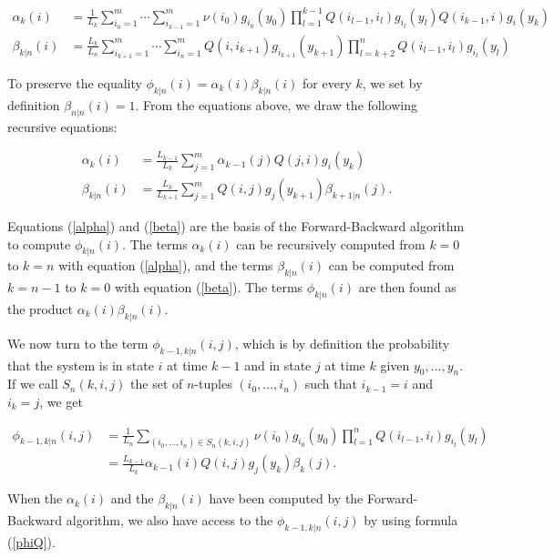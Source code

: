 \documentclass[12pt]{article}
\begin{document}
\begin{appendices}
    \begin{align*}
      \alpha_k(i) &= \frac{1}{L_k}
      \sum_{i_0=1}^m \cdots \sum_{i_{k-1}=1}^m
      \nu(i_0)g_{i_0}(y_0) \prod_{l=1}^{k-1} Q(i_{l-1},i_l) g_{i_l}(y_l)
      Q(i_{k-1}, i)g_i(y_k) \\
      \beta_{k|n}(i) &= \frac{L_k}{L_n}
      \sum_{i_{k+1}=1}^m \cdots \sum_{i_n=1}^m
      Q(i, i_{k+1})g_{i_{k+1}}(y_{k+1})
      \prod_{l=k+2}^n Q(i_{l-1}, i_l)g_{i_l}(y_l)
    \end{align*}

    To preserve the equality $\phi_{k|n}(i) = \alpha_k(i)\beta_{k|n}(i)$
    for every $k$, we set by definition $\beta_{n|n}(i) = 1$.
    From the equations above, we draw the following recursive
    equations:

    \begin{align} \alpha_k(i) &= \frac{L_{k-1}}{L_k}
      \sum_{j=1}^m \alpha_{k-1}(j) Q(j,i) g_i(y_k) \label{alpha} \\
      \beta_{k|n}(i) &= \frac{L_k}{L_{k+1}}
      \sum_{j=1}^m Q(i,j) g_j(y_{k+1})
      \beta_{k+1|n}(j). \label{beta}
    \end{align}

    Equations (\ref{alpha}) and (\ref{beta}) are the basis of the
    Forward-Backward algorithm to compute $\phi_{k|n}(i)$. The terms
    $\alpha_k(i)$ can be recursively computed from $k=0$ to $k=n$
    with equation (\ref{alpha}), and the terms $\beta_{k|n}(i)$
    can be computed from $k=n-1$ to $k=0$ with equation (\ref{beta}).
    The terms $\phi_{k|n}(i)$ are then found as the product
    $\alpha_k(i)\beta_{k|n}(i)$.

    We now turn to the term $\phi_{k-1,k|n}(i,j)$, which is by
    definition the probability that the system is in state $i$ at
    time $k-1$ and in state $j$ at time $k$ given $y_0, \ldots, y_n$.
    If we call $S_n(k,i,j)$
    the set of $n$-tuples $(i_0, \ldots, i_n)$ such that
    $i_{k-1} = i$ and $i_k = j$, we get

    \begin{align}
      \phi_{k-1,k|n}(i,j) &= \frac{1}{L_n}
       \sum_{(i_0, \ldots, i_n) \in S_n(k,i,j)}
       \nu(i_0)g_{i_0}(y_0) \prod_{l=1}^n Q(i_{l-1}, i_l)
       g_{i_l}(y_l) \nonumber \\
        &= \frac{L_{k-1}}{L_k}
       \alpha_{k-1}(i) Q(i,j) g_j(y_k) \beta_k(j). \label{phiQ}
    \end{align}

    When the $\alpha_k(i)$ and the $\beta_{k|n}(i)$ have been
    computed by the Forward-Backward algorithm, we also have access
    to the $\phi_{k-1,k|n}(i,j)$ by using formula (\ref{phiQ}).


\end{appendices}
\end{document}
